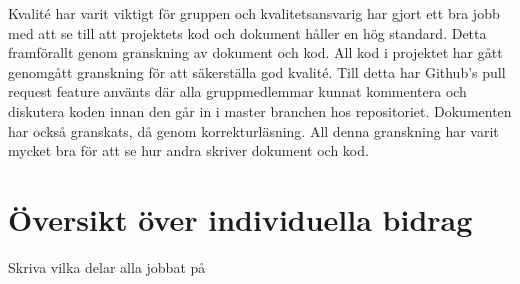 Kvalité har varit viktigt för gruppen och kvalitetsansvarig har gjort ett bra jobb med att se till att projektets kod och dokument håller en hög standard. Detta framförallt genom granskning av dokument och kod. All kod i projektet har gått genomgått granskning för att säkerställa god kvalité. Till detta har Github's pull request feature använts där alla gruppmedlemmar kunnat kommentera och diskutera koden innan den går in i master branchen hos repositoriet. Dokumenten har också granskats, då genom korrekturläsning. All denna granskning har varit mycket bra för att se hur andra skriver dokument och kod.  

\section{Översikt över individuella bidrag}

Skriva vilka delar alla jobbat på


